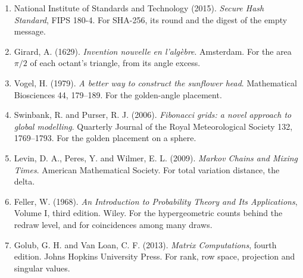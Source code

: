 \begin{enumerate}
  \item National Institute of Standards and Technology (2015). \emph{Secure Hash Standard}, FIPS 180-4. For SHA-256, its round and the digest of the empty message.
  \item Girard, A. (1629). \emph{Invention nouvelle en l'alg\`ebre}. Amsterdam. For the area \(\pi/2\) of each octant's triangle, from its angle excess.
  \item Vogel, H. (1979). \emph{A better way to construct the sunflower head}. Mathematical Biosciences 44, 179--189. For the golden-angle placement.
  \item Swinbank, R. and Purser, R. J. (2006). \emph{Fibonacci grids: a novel approach to global modelling}. Quarterly Journal of the Royal Meteorological Society 132, 1769--1793. For the golden placement on a sphere.
  \item Levin, D. A., Peres, Y. and Wilmer, E. L. (2009). \emph{Markov Chains and Mixing Times}. American Mathematical Society. For total variation distance, the delta.
  \item Feller, W. (1968). \emph{An Introduction to Probability Theory and Its Applications}, Volume I, third edition. Wiley. For the hypergeometric counts behind the redraw level, and for coincidences among many draws.
  \item Golub, G. H. and Van Loan, C. F. (2013). \emph{Matrix Computations}, fourth edition. Johns Hopkins University Press. For rank, row space, projection and singular values.
\end{enumerate}
